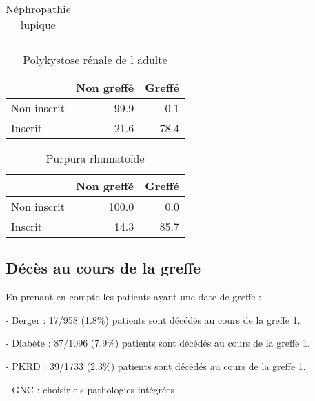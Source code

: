 \documentclass[11pt,a4paper]{article}\usepackage[]{graphicx}\usepackage[]{color}
\begin{document}
\begin{multicols}{2}
\begin{table}[H]
\begin{tabular}{lrr}
   \hline
\end{tabular}
\caption{Néphropathie lupique} 
\end{table}
\begin{table}[H]
\centering
\begin{tabular}{lrr}
  \hline
 & Non greffé & Greffé \\ 
  \hline
Non inscrit & 99.9 & 0.1 \\ 
  Inscrit & 21.6 & 78.4 \\ 
   \hline
\end{tabular}
\caption{Polykystose rénale de l adulte} 
\end{table}
\begin{table}[H]
\centering
\begin{tabular}{lrr}
  \hline
 & Non greffé & Greffé \\ 
  \hline
Non inscrit & 100.0 & 0.0 \\ 
  Inscrit & 14.3 & 85.7 \\ 
   \hline
\end{tabular}
\caption{Purpura rhumatoïde} 
\end{table}

\end{multicols}

  \subsection{Décès au cours de la greffe}

En prenant en compte les patients ayant une date de greffe :

- Berger : 17/958 (1.8\%) patients sont décédés au cours de la greffe 1.

- Diabète : 87/1096 (7.9\%) patients sont décédés au cours de la greffe 1.

- PKRD : 39/1733 (2.3\%) patients sont décédés au cours de la greffe 1.

- GNC : choisir els pathologies intégrées
\end{document}
